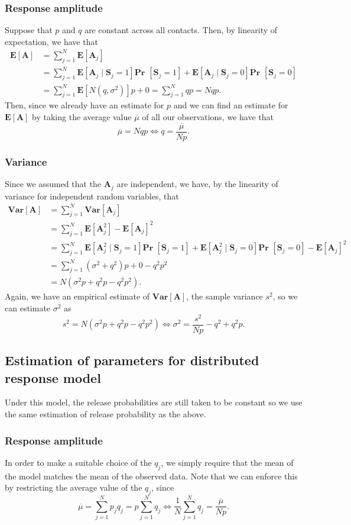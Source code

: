 \documentclass{article}
\def\Pr{\textbf{Pr }}
\def\Var{\textbf{Var}}
\def\E{\textbf{E}}
\newcommand{\rv}[1] {
\text{$\bm{#1}$}
}
\begin{document}
\subsubsection{Response amplitude}
Suppose that $p$ and $q$ are constant across all contacts. Then, by linearity of expectation, we have that
\begin{align*}
  \E[\rv{A}] &= \sum_{j=1}^N \E[\rv{A}_j] \\
  &= \sum_{j=1}^N \E[\rv{A}_j\mid \rv{S}_j = 1]\Pr[\rv{S}_j = 1] + \E[\rv{A}_j\mid \rv{S}_j = 0]\Pr[\rv{S}_j = 0] \\
  &= \sum_{j=1}^N \E[N(q,\sigma^2)]p + 0 = \sum_{j=1}^N qp = Nqp.
\end{align*}
Then, since we already have an estimate for $p$ and we can find an estimate for $\E[\rv{A}]$ by taking the average value $\overline{\mu}$ of all our observations, we have that
\[
  \overline{\mu} = Nqp \iff q = \frac{\overline{\mu}}{Np}.
\]

\subsubsection{Variance}
Since we assumed that the $\rv{A}_j$ are independent, we have, by the linearity of variance for independent random variables, that
\begin{align*}
  \Var[\rv{A}] &= \sum_{j=1}^N \Var[\rv{A}_j] \\
  &= \sum_{j=1}^N \E[\rv{A}_j^2] - \E[\rv{A}_j]^2 \\
  &= \sum_{j=1}^N \E[\rv{A}_j^2\mid \rv{S}_j = 1]\Pr[\rv{S}_j = 1] + \E[\rv{A}_j^2\mid \rv{S}_j = 0]\Pr[\rv{S}_j = 0] - \E[\rv{A}_j]^2 \\
  &= \sum_{j=1}^N (\sigma^2 + q^2)p + 0 - q^2p^2 \\
  &= N(\sigma^2p + q^2p - q^2p^2).
\end{align*}
Again, we have an empirical estimate of $\Var[\rv{A}]$, the sample variance $s^2$, so we can estimate $\sigma^2$ as
\[
  s^2 = N(\sigma^2p + q^2p - q^2p^2) \iff \sigma^2 = \frac{s^2}{Np} - q^2 + q^2p.
\]

\subsection{Estimation of parameters for distributed response model}
Under this model, the release probabilities are still taken to be constant so we use the same estimation of release probability as the above.

\subsubsection{Response amplitude}
In order to make a suitable choice of the $q_j$, we simply require that the mean of the model matches the mean of the observed data. Note that we can enforce this by restricting the average value of the $q_j$, since
\[
  \overline{\mu} = \sum_{j=1}^N p_jq_j = p\sum_{j=1}^N q_j \iff \frac1{N} \sum_{j=1}^N q_j = \frac{\overline{\mu}}{Np}.
\]
\end{document}

